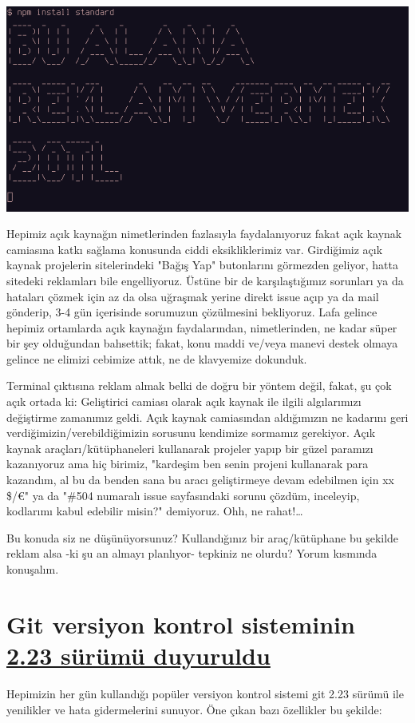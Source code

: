 \documentclass[11pt]{article}
\begin{document}
\begin{center}
\includegraphics[width=.9\linewidth]{gorseller/terminal-reklam.png}
\end{center}

Hepimiz açık kaynağın nimetlerinden fazlasıyla faydalanıyoruz fakat açık
kaynak camiasına katkı sağlama konusunda ciddi eksikliklerimiz var. Girdiğimiz
açık kaynak projelerin sitelerindeki "Bağış Yap" butonlarını görmezden
geliyor, hatta sitedeki reklamları bile engelliyoruz. Üstüne bir de
karşılaştığımız sorunları ya da hataları çözmek için az da olsa uğraşmak
yerine direkt issue açıp ya da mail gönderip, 3-4 gün içerisinde sorumuzun
çözülmesini bekliyoruz. Lafa gelince hepimiz ortamlarda açık kaynağın
faydalarından, nimetlerinden, ne kadar süper bir şey olduğundan bahsettik;
fakat, konu maddi ve/veya manevi destek olmaya gelince ne elimizi cebimize
attık, ne de klavyemize dokunduk.

Terminal çıktısına reklam almak belki de doğru bir yöntem değil, fakat, şu çok
açık ortada ki: Geliştirici camiası olarak açık kaynak ile ilgili algılarımızı
değiştirme zamanımız geldi. Açık kaynak camiasından aldığımızın ne kadarını
geri verdiğimizin/verebildiğimizin sorusunu kendimize sormamız gerekiyor. Açık
kaynak araçları/kütüphaneleri kullanarak projeler yapıp bir güzel paramızı
kazanıyoruz ama hiç birimiz, "kardeşim ben senin projeni kullanarak para
kazandım, al bu da benden sana bu aracı geliştirmeye devam edebilmen için xx
\$/€" ya da "\#504 numaralı issue sayfasındaki sorunu çözdüm, inceleyip,
kodlarımı kabul edebilir misin?" demiyoruz. Ohh, ne rahat!\ldots{}

Bu konuda siz ne düşünüyorsunuz? Kullandığınız bir araç/kütüphane bu şekilde
reklam alsa -ki şu an almayı planlıyor- tepkiniz ne olurdu? Yorum kısmında
konuşalım.
\section{Git versiyon kontrol sisteminin \href{https://raw.githubusercontent.com/git/git/master/Documentation/RelNotes/2.23.0.txt}{2.23 sürümü duyuruldu}}
\label{sec:org49790e3}
Hepimizin her gün kullandığı popüler versiyon kontrol sistemi git 2.23 sürümü
ile yenilikler ve hata gidermelerini sunuyor. Öne çıkan bazı özellikler bu
şekilde:
\end{document}
